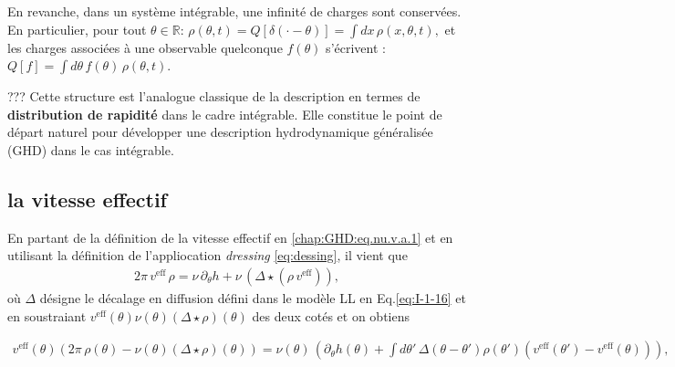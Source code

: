 \medskip

En revanche, dans un système intégrable, une infinité de charges sont conservées. En particulier, pour tout $\theta \in \mathbb{R}$:
\(
\rho(\theta , t ) = Q[\delta(\cdot - \theta)] = \int dx \, \rho(x, \theta, t),
\)
et les charges associées à une observable quelconque $f(\theta)$ s’écrivent :
\(
Q[f] = \int d\theta \, f(\theta) \, \rho(\theta, t).
\)

\medskip

{\color{blue} ??? Cette structure est l’analogue classique de la description en termes de {\bf distribution de rapidité} dans le cadre intégrable.} Elle constitue le point de départ naturel pour développer une description hydrodynamique généralisée (GHD) dans le cas intégrable.


\subsection{la vitesse effectif}

En partant de la définition de la vitesse effectif en \eqref{chap:GHD:eq.nu.v.a.1} et en utilisant la définition de l'appliocation \emph{dressing} \eqref{eq:dessing}, il vient que 
\begin{eqnarray}\label{chap:GHD:veff.1}
	2 \pi \, v^{\mathrm{eff}} \,   \rho   = \nu  \,  \partial_\theta h   + \nu  \,  \left ( \Delta \star ( \rho \,  v^{\mathrm{eff}} )  \right ) ,
\end{eqnarray}
où $\Delta$ désigne le décalage en diffusion défini dans le modèle LL  en Eq.\eqref{eq:I-1-16}
et en soustraiant $v^{\mathrm{eff}} ( \theta ) \nu (\theta) \left ( \Delta \star  \rho  \right )( \theta )$ des deux cotés et on obtiens 

\begin{eqnarray}\label{chap:GHD:veff.2}
	v^{\mathrm{eff}} ( \theta )  \left (  2\pi \, \rho ( \theta ) - \nu (\theta) \left ( \Delta \star  \rho  \right )( \theta ) \right )    = \nu( \theta )  \,  \left (  \partial_\theta h ( \theta )  +  \int d \theta' \, \Delta(\theta - \theta') \rho ( \theta') ( v^{\mathrm{eff}} ( \theta' ) - v^{\mathrm{eff}} ( \theta )  )   \right )  ,
\end{eqnarray}

